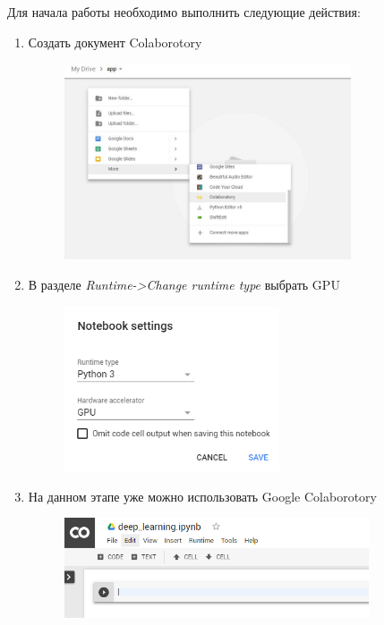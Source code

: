 Для начала работы необходимо выполнить следующие действия:
\begin{enumerate}\label{alg:colab_settings}
\item Создать документ Colaborotory
\begin{figure}[h]
    \centering
    \includegraphics[width=0.8\textwidth]{colab_settings_1.jpeg}
    \label{fig:colab_settings_1}
\end{figure}

\item В разделе \textsl{Runtime->Change runtime type} выбрать GPU
\begin{figure}[h]
    \centering
    \includegraphics[width=0.6\textwidth]{colab_settings_2.png}
    \label{fig:colab_settings_2}
\end{figure}

\newpage

\item На данном этапе уже можно использовать Google Colaborotory
\begin{figure}[h]
    \centering
    \includegraphics[width=0.85\textwidth]{colab_settings_3.png}
    \label{fig:colab_settings_3}
\end{figure}


\end{enumerate}

